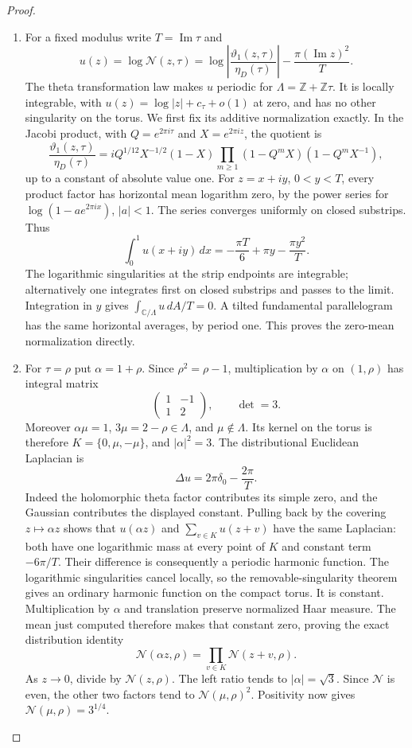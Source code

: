 \begin{proof}
\begin{enumerate}[label=\arabic*.,leftmargin=*]
\item For a fixed modulus write \(T=\operatorname{Im}\tau\) and
\[
 u(z)=\log\mathcal N(z,\tau)
 =\log\left|\frac{\vartheta_1(z,\tau)}{\eta_D(\tau)}\right|
       -\frac{\pi(\operatorname{Im}z)^2}{T}.
\]
The theta transformation law makes \(u\) periodic for
\(\Lambda=\mathbb Z+\mathbb Z\tau\). It is locally integrable,
with \(u(z)=\log|z|+c_\tau+o(1)\) at zero, and has no other
singularity on the torus. We first fix its additive normalization
exactly. In the Jacobi product, with
\(Q=e^{2\pi i\tau}\) and \(X=e^{2\pi iz}\), the quotient is
\[
 \frac{\vartheta_1(z,\tau)}{\eta_D(\tau)}
 =iQ^{1/12}X^{-1/2}(1-X)
       \prod_{m\ge1}(1-Q^mX)(1-Q^mX^{-1}),
\]
up to a constant of absolute value one. For
\(z=x+iy\), \(0<y<T\), every product factor has horizontal
mean logarithm zero, by the power series for
\(\log(1-ae^{2\pi ix})\), \(|a|<1\). The series converges
uniformly on closed substrips. Thus
\[
 \int_0^1u(x+iy)\,dx
       =-\frac{\pi T}{6}+\pi y-\frac{\pi y^2}{T}.
\]
The logarithmic singularities at the strip endpoints are
integrable; alternatively one integrates first on closed substrips
and passes to the limit. Integration in \(y\) gives
\(\int_{\mathbb C/\Lambda}u\,dA/T=0\). A tilted fundamental
parallelogram has the same horizontal averages, by period one.
This proves the zero-mean normalization directly.

\item For \(\tau=\rho\) put \(\alpha=1+\rho\). Since
\(\rho^2=\rho-1\), multiplication by \(\alpha\) on
\((1,\rho)\) has integral matrix
\[
 \begin{pmatrix}1&-1\\1&2\end{pmatrix},\qquad \det=3.
\]
Moreover \(\alpha\mu=1\), \(3\mu=2-\rho\in\Lambda\),
and \(\mu\notin\Lambda\). Its kernel on the torus is therefore
\(K=\{0,\mu,-\mu\}\), and \(|\alpha|^2=3\).
The distributional Euclidean Laplacian is
\[
 \Delta u=2\pi\delta_0-\frac{2\pi}{T}.
\]
Indeed the holomorphic theta factor contributes its simple zero,
and the Gaussian contributes the displayed constant. Pulling back
by the covering \(z\mapsto\alpha z\) shows that
\(u(\alpha z)\) and \(\sum_{v\in K}u(z+v)\) have the same
Laplacian: both have one logarithmic mass at every point of \(K\)
and constant term \(-6\pi/T\). Their difference is consequently
a periodic harmonic function. The logarithmic singularities cancel
locally, so the removable-singularity theorem gives an ordinary
harmonic function on the compact torus. It is constant.
Multiplication by \(\alpha\) and translation preserve normalized
Haar measure. The mean just computed therefore makes that constant
zero, proving the exact distribution identity
\[
 \mathcal N(\alpha z,\rho)
       =\prod_{v\in K}\mathcal N(z+v,\rho).
\]
As \(z\to0\), divide by \(\mathcal N(z,\rho)\). The left
ratio tends to \(|\alpha|=\sqrt3\). Since \(\mathcal N\) is
even, the other two factors tend to \(\mathcal N(\mu,\rho)^2\).
Positivity now gives \(\mathcal N(\mu,\rho)=3^{1/4}\).


\end{enumerate}
\end{proof}
